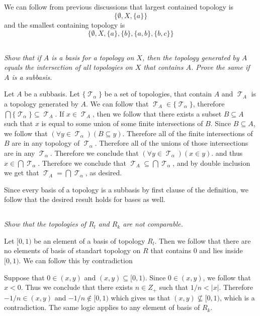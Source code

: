 \documentclass[11pt,oneside,titlepage]{book}
\DeclareMathOperator \topol {\mathcal {T}}
\newcommand{\set}[1]{\{ #1 \}}
\begin{document}
We can follow from previous discussions that largest contained topology is
$$\set{\emptyset, X, \set{a}}$$
and the smallest containing topology is
$$\set{\emptyset, X, \set{a}, \set{b}, \set{a, b}, \set{b, c}}$$

\subsection{}

\textit{Show that if $A$ is a basis for a topology on $X$, then the topology generated by $A$
  equals the intersection of all topologies on $X$ that contains $A$. Prove the same
  if $A$ is a subbasis.}

Let $A$ be a subbasis.
Let $\set{\topol_\alpha}$ be a set of topologies, that contain $A$ and  $\topol_A$ is
a topology generated by $A$. We can follow that $\topol_A \in \set{\topol_\alpha}$,
therefore $\bigcap{\set{\topol_\alpha}} \subseteq {\topol_A}$. If $x \in \topol_A$, then we
follow that there exists a subset $B \subseteq A$ such that $x$ is equal to some
union of some finite intersections of $B$. Since
$B \subseteq A$, we follow that $(\forall y \in \topol_\alpha)(B \subseteq y)$. Therefore
all of the finite intersections of $B$ are in any topology of $\topol_\alpha$.  Therefore
all of the unions of those intersections are in any $\topol_\alpha$. Therefore
we conclude that $(\forall y \in \topol_\alpha)(x \in y)$.
and thus $x \in \bigcap{\topol_\alpha}$.
Therefore we conclude that $\topol_A \subseteq  \bigcap{\topol_\alpha}$, and by double
inclusion we get that $\topol_A =  \bigcap{\topol_\alpha}$, as desired.

Since every basis of a topology is a subbasis by first clause of the definition, we follow
that the desired result holds for bases as well.

\subsection{}

\textit{Show that the topologies of $R_l$ and $R_k$ are not comparable.}

Let $[0, 1)$ be an element of a basis of topology $R_l$. Then we follow that
there are no elements of basis of standart topology on $R$ that contains $0$ and lies inside
$[0, 1)$. We can follow this by contradiction

Suppose that $0 \in (x, y)$ and $(x, y) \subseteq [0, 1)$. Since $0 \in (x, y) $,
we follow that $x < 0$. Thus we conclude that there exists $n \in Z_+$ such that
$1/n < |x|$. Therefore $-1/n \in (x, y)$ and $-1/n \notin [0, 1)$ which gives us
that $(x, y) \not \subseteq [0, 1)$, which is a contradiction.
The same logic applies to any element of basis of $R_k$.
\end{document}
